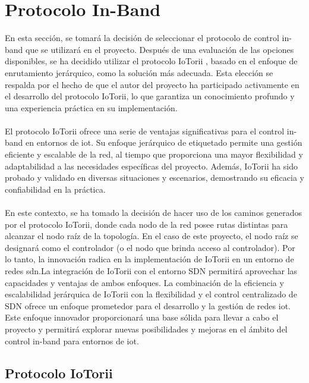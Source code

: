 \section{Protocolo In-Band}
\label{sec:ana_inband}

En esta sección, se tomará la decisión de seleccionar el protocolo de control in-band que se utilizará en el proyecto. Después de una evaluación de las opciones disponibles, se ha decidido utilizar el protocolo IoTorii \cite{rojas2021outperforming}, basado en el enfoque de enrutamiento jerárquico, como la solución más adecuada. Esta elección se respalda por el hecho de que el autor del proyecto ha participado activamente en el desarrollo del protocolo IoTorii, lo que garantiza un conocimiento profundo y una experiencia práctica en su implementación.\\
\\
El protocolo IoTorii ofrece una serie de ventajas significativas para el control in-band en entornos de \gls{iot}. Su enfoque jerárquico de etiquetado permite una gestión eficiente y escalable de la red, al tiempo que proporciona una mayor flexibilidad y adaptabilidad a las necesidades específicas del proyecto. Además, IoTorii ha sido probado y validado en diversas situaciones y escenarios, demostrando su eficacia y confiabilidad en la práctica.\\
\\
En este contexto, se ha tomado la decisión de hacer uso de los caminos generados por el protocolo IoTorii, donde cada nodo de la red posee rutas distintas para alcanzar el nodo raíz de la topología. En el caso de este proyecto, el nodo raíz se designará como el controlador (o el nodo que brinda acceso al controlador). Por lo tanto, la innovación radica en la implementación de IoTorii en un entorno de redes \gls{sdn}.La integración de IoTorii con el entorno SDN permitirá aprovechar las capacidades y ventajas de ambos enfoques. La combinación de la eficiencia y escalabilidad jerárquica de IoTorii con la flexibilidad y el control centralizado de SDN ofrece un enfoque prometedor para el desarrollo y la gestión de redes \gls{iot}. Este enfoque innovador proporcionará una base sólida para llevar a cabo el proyecto y permitirá explorar nuevas posibilidades y mejoras en el ámbito del control in-band para entornos de \gls{iot}.

\subsection{Protocolo IoTorii}

